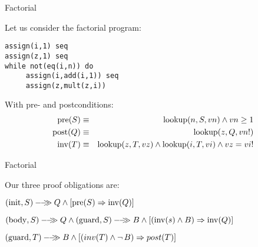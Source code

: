 \documentclass{beamer}
\begin{document}
\begin{frame}[fragile]{Factorial}

\small
Let us consider the factorial program:

\vspace{.1in}

\begin{verbatim}
assign(i,1) seq
assign(z,1) seq
while not(eq(i,n)) do
     assign(i,add(i,1)) seq
     assign(z,mult(z,i))
\end{verbatim}

\vspace{.1in}

With pre- and postconditions:
\begin{eqnarray*}
{\rm pre}(S) &\equiv& {\rm lookup}(n,S,vn) \wedge vn \ge 1\\
{\rm post}(Q) &\equiv& {\rm lookup}(z,Q,vn!)\\
{\rm inv}(T) &\equiv& {\rm lookup}(z,T,vz)\wedge{\rm lookup}(i,T,vi)\wedge vz=vi!\\
\end{eqnarray*}

\end{frame}

\begin{frame}[fragile]{Factorial}

\small
Our three proof obligations are:


\vspace{.1in}

${({\rm init},S)}-\!\!-\!\!\!\!\gg{Q} \wedge [{\rm pre}(S)\Rightarrow {\rm inv}(Q)]$

\vspace{.05in}

$\sem{({\rm body},S)}{Q} \wedge \sem{({\rm guard},S)}{B} \wedge [({\rm inv}(s) \wedge B)\Rightarrow {\rm inv}(Q)]$


\vspace{.05in}

${({\rm guard},T)}-\!\!-\!\!\!\!\gg{B} \wedge [(inv(T) \wedge \neg\,B) \Rightarrow post(T)]$

\end{frame}
\end{document}
